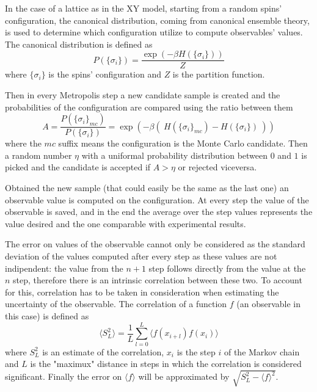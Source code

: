 In the case of a lattice as in the XY model, starting from a random spins' configuration,
the canonical distribution, coming from canonical ensemble theory, is used to determine which
configuration utilize to compute observables' values. The canonical
distribution is defined as
\begin{equation}
P(\{\sigma_i\}) = \frac{\exp(-\beta H(\{\sigma_i\}))}{Z}
\end{equation}
where $\{\sigma_i\}$ is the spins' configuration and $Z$ is the partition function.

Then in every Metropolis step a new candidate sample is created and the 
probabilities of the configuration are compared using the ratio between them
\begin{equation}
A = \frac{P(\{\sigma_i\}_{mc})}{P(\{\sigma_i\})} = \exp(-\beta (\ H(\{\sigma_i\}_{mc})
- H(\{\sigma_i\})\ ))
\end{equation}
where the $mc$ suffix means the configuration is the Monte Carlo candidate.
Then a random number $\eta$ with a uniformal probability distribution between $0$
and $1$ is picked and the candidate is accepted if $A > \eta$ or rejected viceversa. 

Obtained the new sample (that could easily be the same as the last one) an observable
value is computed on the configuration. At every step the value of the observable is
saved, and in the end the average over the step values represents the value desired 
and the one comparable with experimental results.

The error on values of the observable cannot only be considered as the standard
deviation of the values computed after every step as these values are not indipendent:
the value from the $n+1$ step follows directly from the value at the $n$ step, therefore
there is an intrinsic correlation between these two. To account for this, correlation
has to be taken in consideration when estimating the uncertainty of the observable.
The correlation of a function $f$ (an observable in this case) is defined as
\begin{equation}
\langle S_L^2 \rangle = \frac{1}{L} \sum_{l=0}^{L} \langle f(x_{i+l}) f(x_i) \rangle
\end{equation}
where $S_L^2$ is an estimate of the correlation, $x_i$ is the step $i$ of the Markov
chain and $L$ is the "maximux" distance in steps in which the correlation is considered
significant. Finally the error on $\langle f \rangle$ will be approximated by 
$\sqrt{S_L^2 - \langle f \rangle^2}$.


